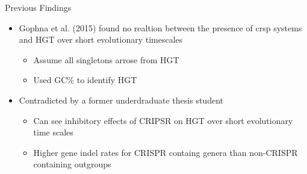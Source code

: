 \documentclass[dvipsnames]{beamer}
\begin{document}
\begin{frame}[fragile]{Previous Findings}
    \begin{itemize}
        \item<2-> Gophna et al. (2015) found no realtion between the presence of \ac{crsp} systems and HGT over short evolutionary timescales
        \begin{itemize}
            \item<3-> Assume all singletons arrose from HGT
            \item<4-> Used GC\% to identify HGT
        \end{itemize}
        \item<5-> Contradicted by a former underdraduate thesis student
        \begin{itemize}
            \item<6-> Can see inhibitory effects of CRIPSR on HGT over short evolutionary time scales
            \item<7-> Higher gene indel rates for CRISPR containg genera than non-CRISPR containing outgroups
        \end{itemize}
    \end{itemize}
\end{frame}
\end{document}
